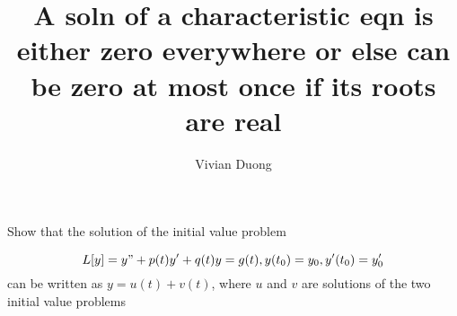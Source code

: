 \documentclass{article}
\title{A soln of a characteristic eqn is either zero everywhere or else can be zero at most once if its roots are real}
\author{Vivian Duong}
\date{}
\begin{document}
Show that the solution of the initial value problem 

\begin{equation}
L[y] = y" + p(t)y' + q(t)y = g(t), y(t_0)=y_0,  y'(t_0)=y_0' 
\end{equation}
can be written as $y = u(t) + v(t)$, where $u$ and $v$ are solutions of the two initial value problems
\end{document}
